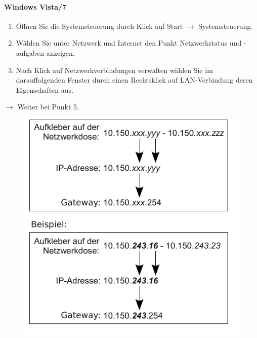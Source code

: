 \documentclass[a4paper,12pt]{scrartcl}
\begin{document}
\paragraph*{Windows Vista/7}
\begin{enumerate}
    \item Öffnen Sie die Systemsteuerung durch Klick auf Start $\rightarrow$ Systemsteuerung.
    \item Wählen Sie unter Netzwerk und Internet den Punkt Netzwerkstatus und -aufgaben anzeigen.
    \item Nach Klick auf Netzwerkverbindungen verwalten wählen Sie im darauffolgenden Fenster durch einen Rechtsklick auf LAN-Verbindung deren Eigenschaften aus.
\end{enumerate}
$\rightarrow$ Weiter bei Punkt 5.
      \begin{figure}[h!]
	\centering
        \vspace{-5pt}
        \begin{minipage}[c]{0.45\linewidth}
          \centering
          \includegraphics[width=\linewidth,keepaspectratio]{Bilder/IP_Gerneric}
        \end{minipage}
        \begin{minipage}[c]{0.48\linewidth}
          \centering

\end{minipage}
\end{figure}
\end{document}
